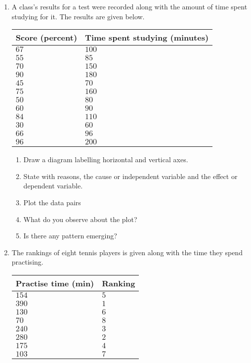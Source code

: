 {
\begin{enumerate}
\item A class's results for a test were recorded along with the amount of time spent studying for it. The results are given below.
\begin{center}
\begin{tabular}{|l|l|}
\hline
Score (percent) & Time spent studying (minutes)  \\ 
\hline
$67 $&$ 100 $ \\
$55 $& $85 $ \\
$70 $& $150 $ \\
$90 $& $180$  \\
$45 $& $70 $ \\
$75 $& $160 $ \\
$50 $& $80 $ \\
$60 $& $90$  \\
$84 $& $110 $ \\
$30$ & $60 $ \\
$66$ & $96 $ \\
$96$ & $200$  \\
\hline
\end{tabular}
\end{center}

	\begin{enumerate}
	\item Draw a diagram labelling horizontal and vertical axes. 
	\item State with reasons, the cause or independent variable and the effect or dependent variable.
	\item Plot the data pairs
	\item What do you observe about the plot?
	\item Is there any pattern emerging? 
	\end{enumerate}
\item The rankings of eight tennis players is given along with the time they spend practising.

\begin{center}
\begin{tabular}{|l|l|}
\hline
Practise time (min) & Ranking  \\ 
\hline
$154$ & $5$ \\
$390$ & $1$ \\
$130$ & $6$ \\
$70 $ & $8$ \\
$240$ & $3$ \\
$280$ & $2$ \\
$175$ & $4$ \\
$103$ & $7$ \\
\hline
\end{tabular}
\end{center}


\end{enumerate}}
